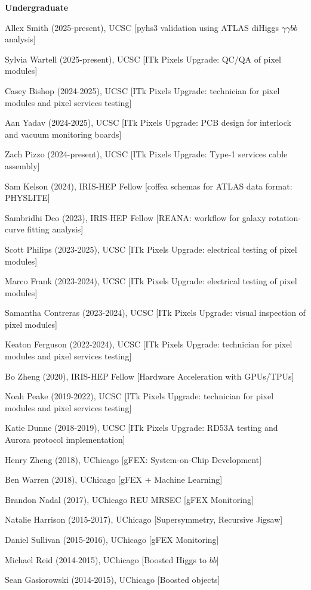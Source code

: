 \documentclass[margin,line]{resume}
\begin{document}
\begin{resume}
\textbf{Undergraduate}
\begin{list2}
  \item Allex Smith (2025-present), UCSC [pyhs3 validation using ATLAS diHiggs $\gamma\gamma bb$ analysis]
  \item Sylvia Wartell (2025-present), UCSC [ITk Pixels Upgrade: QC/QA of pixel modules]
  \item Casey Bishop (2024-2025), UCSC [ITk Pixels Upgrade: technician for pixel modules and pixel services testing]
  \item Aan Yadav (2024-2025), UCSC [ITk Pixels Upgrade: PCB design for interlock and vacuum monitoring boards]
  \item Zach Pizzo (2024-present), UCSC [ITk Pixels Upgrade: Type-1 services cable assembly]
  \item Sam Kelson (2024), IRIS-HEP Fellow [coffea schemas for ATLAS data format: PHYSLITE]
  \item Sambridhi Deo (2023), IRIS-HEP Fellow [REANA: workflow for galaxy rotation-curve fitting analysis]
  \item Scott Philips (2023-2025), UCSC [ITk Pixels Upgrade: electrical testing of pixel modules]
  \item Marco Frank (2023-2024), UCSC [ITk Pixels Upgrade: electrical testing of pixel modules]
  \item Samantha Contreras (2023-2024), UCSC [ITk Pixels Upgrade: visual inspection of pixel modules]
  \item Keaton Ferguson (2022-2024), UCSC [ITk Pixels Upgrade: technician for pixel modules and pixel services testing]
  \item Bo Zheng (2020), IRIS-HEP Fellow [Hardware Acceleration with GPUs/TPUs]
  \item Noah Peake (2019-2022), UCSC [ITk Pixels Upgrade: technician for pixel modules and pixel services testing]
  \item Katie Dunne (2018-2019), UCSC [ITk Pixels Upgrade: RD53A testing and Aurora protocol implementation]
  \item Henry Zheng (2018), UChicago [gFEX: System-on-Chip Development]
  \item Ben Warren (2018), UChicago [gFEX + Machine Learning]
  \item Brandon Nadal (2017), UChicago REU MRSEC [gFEX Monitoring]
  \item Natalie Harrison (2015-2017), UChicago [Supersymmetry, Recursive Jigsaw]
  \item Daniel Sullivan (2015-2016), UChicago [gFEX Monitoring]
  \item Michael Reid (2014-2015), UChicago [Boosted Higgs to $bb$]
  \item Sean Gasiorowski (2014-2015), UChicago [Boosted objects]
\end{list2}


\end{resume}
\end{document}

